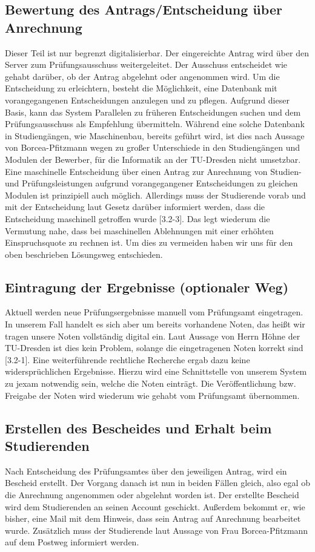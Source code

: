 \subsection{Bewertung des Antrags/Entscheidung über Anrechnung}
Dieser Teil ist nur begrenzt digitalisierbar. Der eingereichte Antrag wird über den Server zum Prüfungsausschuss weitergeleitet. Der Ausschuss entscheidet wie gehabt darüber, ob der Antrag abgelehnt oder angenommen wird. Um die Entscheidung zu erleichtern, besteht die Möglichkeit, eine Datenbank mit vorangegangenen Entscheidungen anzulegen und zu pflegen. Aufgrund dieser Basis, kann das System Parallelen zu früheren Entscheidungen suchen und dem Prüfungsausschuss als Empfehlung übermitteln. Während eine solche Datenbank in Studiengängen, wie Maschinenbau, bereits geführt wird, ist dies nach Aussage von Borcea-Pfitzmann wegen zu großer Unterschiede in den Studiengängen und Modulen der Bewerber, für die Informatik an der TU-Dresden nicht umsetzbar.
Eine maschinelle Entscheidung über einen Antrag zur Anrechnung von Studien- und Prüfungsleistungen aufgrund vorangegangener Entscheidungen zu gleichen Modulen ist prinzipiell auch möglich. Allerdings muss der Studierende vorab und mit der Entscheidung laut Gesetz darüber informiert werden, dass die Entscheidung maschinell getroffen wurde [3.2-3]. Das legt wiederum die Vermutung nahe, dass bei maschinellen Ablehnungen mit einer erhöhten Einspruchsquote zu rechnen ist. Um dies zu vermeiden haben wir uns für den oben beschrieben Lösungsweg entschieden.

\subsection{Eintragung der Ergebnisse (optionaler Weg)}
Aktuell werden neue Prüfungsergebnisse manuell vom Prüfungsamt eingetragen. In unserem Fall handelt es sich aber um bereits vorhandene Noten, das heißt wir tragen unsere Noten vollständig digital ein. Laut Aussage von Herrn Höhne der TU-Dresden ist dies kein Problem, solange die eingetragenen Noten korrekt sind [3.2-1]. Eine weiterführende rechtliche Recherche ergab dazu keine widersprüchlichen Ergebnisse.
Hierzu wird eine Schnittstelle von unserem System zu jexam notwendig sein, welche die Noten einträgt. Die Veröffentlichung bzw. Freigabe der Noten wird wiederum wie gehabt vom Prüfungsamt übernommen.

\subsection{Erstellen des Bescheides und Erhalt beim Studierenden}
Nach Entscheidung des Prüfungsamtes über den jeweiligen Antrag, wird ein Bescheid erstellt. Der Vorgang danach ist nun in beiden Fällen gleich, also egal ob die Anrechnung angenommen oder abgelehnt worden ist. Der erstellte Bescheid wird dem Studierenden an seinen Account geschickt. Außerdem bekommt er, wie bisher, eine Mail mit dem Hinweis, dass sein Antrag auf Anrechnung bearbeitet wurde. Zusätzlich muss der Studierende laut Aussage von Frau Borcea-Pfitzmann auf dem Postweg informiert werden.

